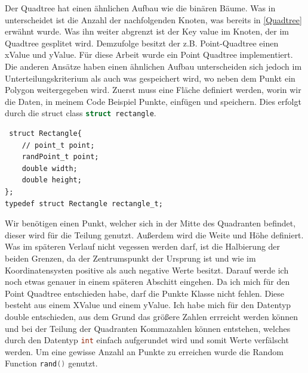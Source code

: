 \documentclass[11pt]{article}
\newcommand{\qt}{Quadtree }
\newcommand{\lstin}[1]{\lstinline[language=C]{#1}}
\begin{document}
Der \qt hat einen ähnlichen Aufbau wie die binären Bäume. Was in unterscheidet ist die Anzahl der nachfolgenden Knoten, was bereits in \ref{Quadtree} erwähnt wurde.
Was ihn weiter abgrenzt ist der Key value im Knoten, der im \qt gesplitet wird. Demzufolge besitzt der z.B. Point-\qt einen xValue und yValue. \newline
Für diese Arbeit wurde ein Point \qt implementiert. Die anderen Ansätze haben einen ähnlichen Aufbau unterscheiden sich jedoch im Unterteilungskriterium als auch was gespeichert wird, wo neben dem Punkt ein Polygon weitergegeben wird.
\newline
Zuerst muss eine Fläche definiert werden, worin wir die Daten, in meinem Code Beispiel Punkte, einfügen und speichern. Dies erfolgt durch die struct class \lstin{struct rectangle}.
\begin{lstlisting}
 struct Rectangle{
    // point_t point; 
    randPoint_t point;                                                       
    double width;
    double height; 
};
typedef struct Rectangle rectangle_t;
\end{lstlisting}
Wir benötigen einen Punkt, welcher sich in der Mitte des Quadranten befindet, dieser wird für die Teilung genutzt. Außerdem wird die Weite und Höhe definiert. 
Was im späteren Verlauf nicht vegessen werden darf, ist die Halbierung der beiden Grenzen, da der Zentrumspunkt der Ursprung ist und wie im Koordinatensysten positive als auch negative Werte besitzt. 
Darauf werde ich noch etwas genauer in einem späteren Abschitt eingehen. 
\newline
Da ich mich für den Point \qt entschieden habe, darf die Punkte Klasse nicht fehlen. Diese besteht aus einem XValue und einem yValue. Ich habe mich für den Datentyp double entschieden, aus dem Grund das größere Zahlen errreicht werden können und bei der Teilung der Quadranten Kommazahlen können entstehen, welches durch den Datentyp \lstin{int} einfach aufgerundet wird und somit Werte verfälscht werden. 
Um eine gewisse Anzahl an Punkte zu erreichen wurde die Random Function \lstin{rand()} genutzt.  
 
\end{document}
